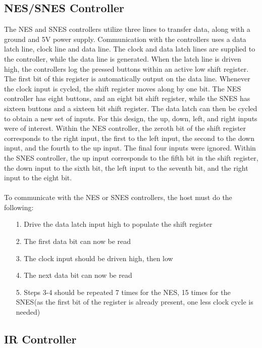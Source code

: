\documentclass[]{article}
\begin{document}
\subsection{NES/SNES Controller}
The NES and SNES controllers utilize three lines to transfer data, along with a ground and 5V power supply. Communication with the controllers uses a data latch line, clock line and data line. The clock and data latch lines are supplied to the controller, while the data line is generated. When the latch line is driven high, the controllers log the pressed buttons within an active low shift register. The first bit of this register is automatically output on the data line. Whenever the clock input is cycled, the shift register moves along by one bit. The NES controller has eight buttons, and an eight bit shift register, while the SNES has sixteen buttons and a sixteen bit shift register. The data latch can then be cycled to obtain a new set of inputs. For this design, the up, down, left, and right inputs were of interest. Within the NES controller, the zeroth bit of the shift register corresponds to the right input, the first to  the left input, the second to the down input, and the fourth to the up input\cite{NESFunction}. The final four inputs were ignored. Within the SNES controller, the up input corresponds to the fifth bit in the shift register, the down input to the sixth bit, the left input to the seventh bit, and the right input to the eight bit\cite{SNESFunction}. \\~\\
To communicate with the NES or SNES controllers, the host must do the following:
\begin{itemize}
    \item[1.] Drive the data latch input high to populate the shift register
    \item[2.] The first data bit can now be read
    \item[3.] The clock input should be driven high, then low
    \item[4.] The next data bit can now be read
    \item[5.] Steps 3-4 should be repeated 7 times for the NES, 15 times for the SNES(as the first bit of the register is already present, one less clock cycle is needed)\cite{SNESFunction}
\end{itemize}

\subsection{IR Controller}
\end{document}
